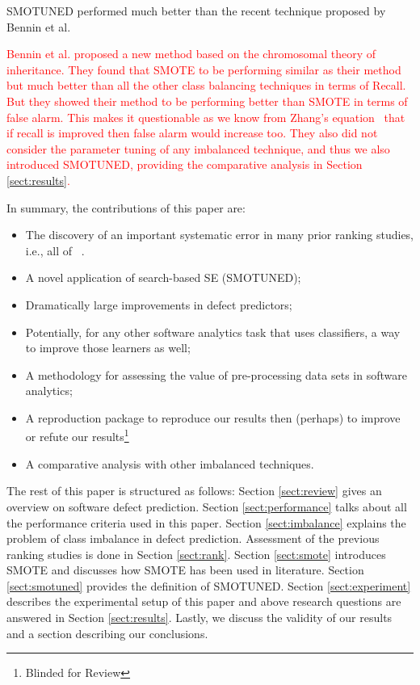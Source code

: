 \documentclass[sigconf,review, anonymous]{acmart}
\newcommand{\bi}{\begin{itemize}[leftmargin=0.4cm]}
\newcommand{\ei}{\end{itemize}}
\theoremstyle{break}
\theoremstyle{break}
\newcommand{\tion}[1]{{Section }\ref{sect:#1}}
\newcommand{\sma}{{\sc SMOTE}}
\newcommand{\smb}{{\sc SMOTUNED}}
\begin{document}
   \begin{lesson}{\smb} performed much better than the recent technique proposed by Bennin et al.\cite{bennin2017mahakil}
 \end{lesson}
 \noindent
 \textcolor{red}{Bennin et al. proposed a new method based on the chromosomal theory of inheritance. They found that {\sma} to be performing similar as their method but much better than all the other class balancing techniques in terms of Recall. But they showed their method to be performing better than {\sma} in terms of false alarm. This makes it questionable as we know from Zhang's equation~\cite{zhang2007comments} that if recall is improved then false alarm would increase too. They also did not consider the parameter tuning of any imbalanced technique, and thus we also  introduced {\smb}, providing the comparative analysis in Section \ref{sect:results}.}
 
\noindent
In summary, the  contributions of this paper are:
\bi
\item The discovery of an important systematic error in  many prior ranking studies, i.e., all of
~\cite{lessmann2008benchmarking,hall2012systematic,elish2008predicting,menzies2010defect,gondra2008applying,radjenovic2013software,jiang2008techniques,wang2013using,mende2009revisiting,li2012sample,khoshgoftaar2010attribute,jiang2009variance,ghotra2015revisiting,jiang2008can,tantithamthavorn2016automated,fu2016tuning}.
\item A novel application of search-based SE ({\smb});
\item Dramatically large improvements in  defect predictors;
\item Potentially, for any other software analytics task that uses classifiers, a way to improve those learners as well;
\item A methodology for assessing the value of pre-processing data sets in software analytics;
\item A reproduction package to reproduce our results then (perhaps) to improve or refute  our results\footnote{Blinded for Review}
\item A comparative analysis with other imbalanced techniques.
\ei
The rest of this paper is structured as follows:
\tion{review} gives an overview on software defect prediction.
\tion{performance} talks about all the performance criteria used in this paper.
\tion{imbalance} explains the problem of class imbalance in defect prediction. Assessment of the previous ranking studies is done in \tion{rank}.
\tion{smote} introduces {\sma} and discusses how {\sma} has been used in literature. \tion{smotuned} provides the definition of {\smb}. \tion{experiment} describes the experimental setup of this paper and above research questions are answered in
\tion{results}. Lastly, we discuss the validity of our results 
and a section describing our conclusions.
 
\end{document}
